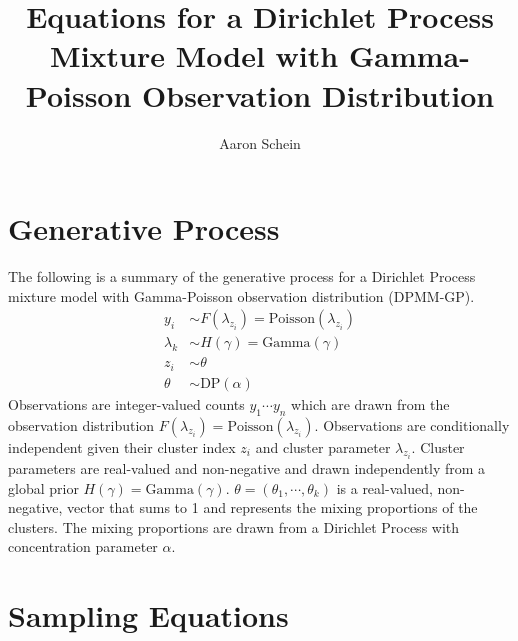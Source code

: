 \documentclass[12pt,letterpaper]{article}
\title{Equations for a Dirichlet Process Mixture Model with Gamma-Poisson Observation Distribution}
\author{Aaron Schein}
\begin{document}
\maketitle

\section{Generative Process}
The following is a summary of the generative process for a Dirichlet Process mixture model with Gamma-Poisson observation distribution (DPMM-GP). 
\begin{align}
y_i &\sim F(\lambda_{z_i}) = \text{Poisson}(\lambda_{z_i}) \\
\lambda_k &\sim H(\gamma) = \text{Gamma}(\gamma) \\
z_i &\sim \theta\\
\theta &\sim \text{DP}(\alpha)
\end{align}
Observations are integer-valued counts $y_1 \cdots y_n$ which are drawn from the observation distribution $F(\lambda_{z_i}) = \text{Poisson}(\lambda_{z_i})$.  Observations are conditionally independent given their cluster index $z_i$ and cluster parameter $\lambda_{z_i}$.  Cluster parameters are real-valued and non-negative and drawn independently from a global prior $H(\gamma) = \text{Gamma}(\gamma)$.  $\theta = (\theta_1,\cdots,\theta_k)$ is a real-valued, non-negative, vector that sums to 1 and represents the mixing proportions of the clusters.  The mixing proportions are drawn from a Dirichlet Process with concentration parameter $\alpha$. 

\section{Sampling Equations}
\end{document}
